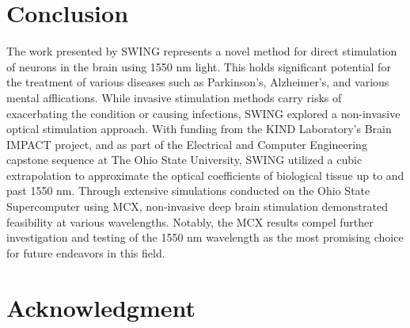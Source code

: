 \documentclass[journal,twoside,web]{ieeecolor}
\begin{document}
\section{Conclusion}
\label{sec:conclusion}
The work presented by SWING represents a novel method for direct stimulation of neurons in the brain using 1550 nm light. This holds significant potential 
for the treatment of various diseases such as Parkinson's, Alzheimer's, and various mental afflications. 
While invasive stimulation methods carry risks of exacerbating the condition or causing infections, SWING explored a non-invasive optical stimulation approach. 
With funding from the KIND Laboratory's Brain IMPACT project, and as part of the Electrical and Computer Engineering capstone sequence at The Ohio State University, 
SWING utilized a cubic extrapolation to approximate the optical coefficients of biological tissue up to and past 1550 nm. Through extensive simulations conducted on 
the Ohio State Supercomputer using MCX, non-invasive deep brain stimulation demonstrated feasibility at various wavelengths. Notably, 
the MCX results compel further investigation and testing of the 1550 nm wavelength as the most promising choice for future endeavors in this field. 

\section*{Acknowledgment}
\end{document}
